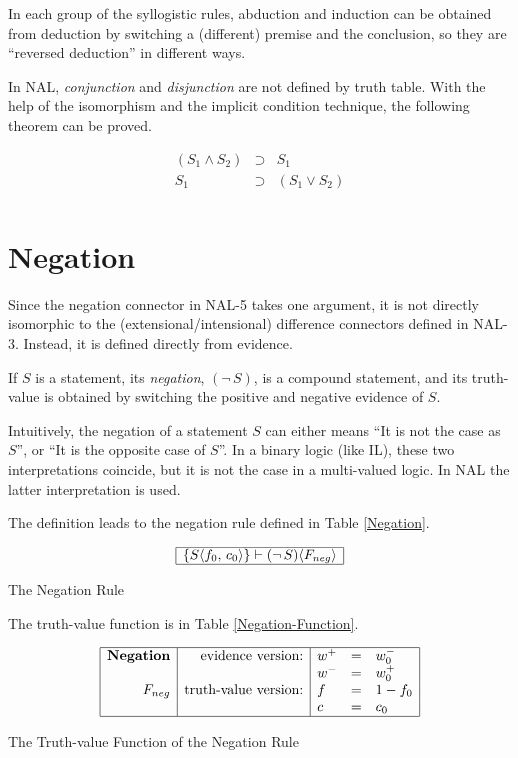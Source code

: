 In each group of the syllogistic rules, abduction and induction can be obtained from deduction by switching a (different) premise and the conclusion, so they are ``reversed deduction'' in different ways.

In NAL, \emph{conjunction} and \emph{disjunction} are not defined by truth table. With the help of the isomorphism and the implicit condition technique, the following theorem can be proved. 
\begin{theo}
\[\begin{array}{rcl}
(S_1 \wedge S_2) & \supset & S_1 \\
S_1 & \supset & (S_1 \vee S_2) \\
\end{array} \]
\end{theo}


\section{Negation}

Since the negation connector in NAL-5 takes one argument, it is not directly isomorphic to the (extensional/intensional) difference connectors defined in NAL-3.  Instead, it is defined directly from evidence.
\begin{defi}
If $S$ is a statement, its {\em negation}, \((\neg \, S)\), is a compound statement, and its truth-value is obtained by switching the positive and negative evidence of $S$.
\end{defi}
Intuitively, the negation of a statement $S$ can either means ``It is not the case as $S$'', or ``It is the opposite case of $S$''. In a binary logic (like IL), these two interpretations coincide, but it is not the case in a multi-valued logic. In NAL the latter interpretation is used.

The definition leads to the negation rule defined in Table \ref{Negation}.

\begin{table}[htb]
\[\begin{array}{|r|} \hline
\{S \langle f_0, \, c_0\rangle \} \vdash (\neg \, S) \langle F_{neg}\rangle  \\
\hline \end{array}\]
\caption{The Negation Rule}
\label{Negation}
\end{table}

The truth-value function is in Table \ref{Negation-Function}.

\begin{table}[htb]
\[\begin{array}{|r|r|lcl|} \hline
\mbox{\textbf{Negation}} & \mbox{evidence version:}    & w^+ & = & w^-_0 \\
								         &					                   & w^- & = & w^+_0 \\
                 F_{neg} & \mbox{truth-value version:} & f & = & 1 - f_0\\
								         &					                   & c & = & c_0\\
\hline \end{array}\]
\caption{The Truth-value Function of the Negation Rule}
\label{Negation-Function}
\end{table}

